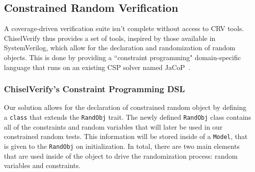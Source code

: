 \documentclass[conference]{IEEEtran}
\begin{document}


\subsection{Constrained Random Verification}
A coverage-driven verification suite isn't complete without access to CRV tools.
ChiselVerify thus provides a set of tools, inspired by those available in SystemVerilog, which allow for the declaration and randomization of random objects.
This is done by providing a ``constraint programming" domain-specific language that runs on an existing CSP solver named JaCoP~\cite{jacop2013}.

\subsubsection{ChiselVerify's Constraint Programming DSL}
Our solution allows for the declaration of constrained random object by defining a \texttt{class} that extends the \texttt{RandObj} trait.
The newly defined \texttt{RandObj} class contains all of the constraints and random variables that will later be used in our constrained random tests. 
This information will be stored inside of a \texttt{Model}, that is given to the \texttt{RandObj} on initialization.
In total, there are two main elements that are used inside of the object to drive the randomization process: random variables and constraints.
\end{document}
